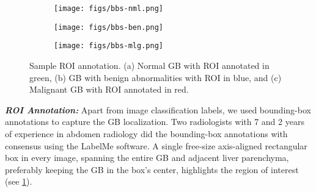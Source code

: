 \documentclass[10pt,twocolumn,letterpaper]{article}
\newcommand{\myfirstpara}[1]{\noindent \textbf{\textit{#1:}}}
\begin{document}
\begin{figure}[h]
    \centering
     \begin{subfigure}[b]{0.32\linewidth}
		\centering
		\texttt{[image: figs/bbs-nml.png]}
		\caption{}
	\end{subfigure}
    \begin{subfigure}[b]{0.32\linewidth}
		\centering
		\texttt{[image: figs/bbs-ben.png]}
		\caption{}
	\end{subfigure}
    \begin{subfigure}[b]{0.32\linewidth}
		\centering
		\texttt{[image: figs/bbs-mlg.png]}
		\caption{}
	\end{subfigure}
   \caption{Sample ROI annotation. (a) Normal GB with ROI annotated in green, (b) GB with benign abnormalities with ROI in blue, and (c) Malignant GB with ROI annotated in red. }
    \label{fig:bb_sample}
\end{figure}
\myfirstpara{ROI Annotation} Apart from image classification labels, we used bounding-box annotations to capture the GB localization. Two radiologists with 7 and 2 years of experience in abdomen radiology did the bounding-box annotations with consensus using the LabelMe \cite{russell2008labelme} software. A single free-size axis-aligned rectangular box in every image, spanning the entire GB and adjacent liver parenchyma, preferably keeping the GB in the box's center, highlights the region of interest (see \cref{fig:bb_sample}).
\end{document}
